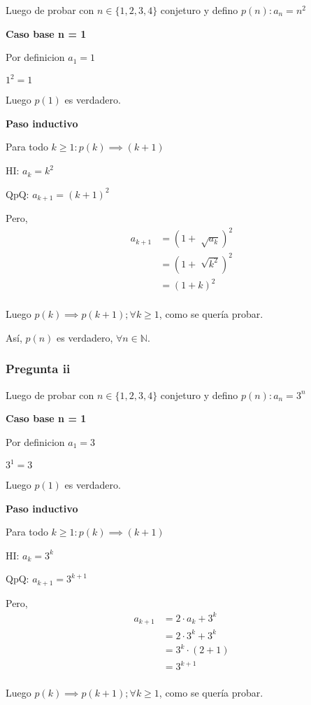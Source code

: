 Luego de probar con $ n \in \{ 1,2,3,4 \} $ conjeturo y defino $ p(n): a_n = n^2 $

\textbf{Caso base n = 1}

Por definicion $ a_1 = 1$

$ 1^2 = 1$

Luego $ p(1) $ es verdadero.

\textbf{Paso inductivo}

Para todo $k \geq 1: p(k) \implies (k+1)$

HI: $ a_k = k^2$

QpQ: $ a_{k+1} = (k+1)^2$

Pero,
\begin{align*}
    a_{k+1} &= (1+\sqrt[]{a_k})^2 \\
    &= (1+\sqrt[]{k^2})^2 \\
    &= (1+k)^2 \\
\end{align*}

Luego $p(k) \implies p(k+1); \forall k \geq 1$, como se quería probar.

Así, $p(n)$ es verdadero, $\forall n \in \mathbb{N}$.

\subsubsection{Pregunta ii}

Luego de probar con $ n \in \{ 1,2,3,4 \} $ conjeturo y defino $ p(n): a_n = 3^n $

\textbf{Caso base n = 1}

Por definicion $ a_1 = 3$

$ 3^1 = 3$

Luego $ p(1) $ es verdadero.

\textbf{Paso inductivo}

Para todo $k \geq 1: p(k) \implies (k+1)$

HI: $ a_k = 3^k$

QpQ: $ a_{k+1} = 3^{k+1}$

Pero,
\begin{align*}
    a_{k+1} &= 2\cdot a_k + 3^k \\
    &= 2\cdot 3^k + 3^k \\
    &= 3^k\cdot (2+1) \\
    &= 3^{k+1} \\
\end{align*}

Luego $p(k) \implies p(k+1); \forall k \geq 1$, como se quería probar.

